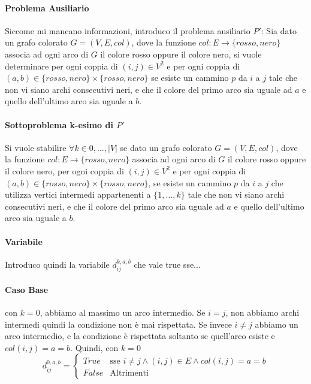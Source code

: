 \documentclass[12pt, a4paper, openany]{book}
\begin{document}
\paragraph*{Problema Ausiliario} 
Siccome mi mancano informazioni, introduco il problema ausiliario $P'$:
Sia dato un grafo colorato $G=(V,E,col)$, dove la funzione $col:E\to \{rosso,nero\}$ associa ad ogni arco di $G$ il colore rosso oppure il colore nero,
si vuole determinare per ogni coppia di $(i,j) \in V^2$ e per ogni coppia di $(a,b)\in \{rosso,nero\}\times \{rosso,nero\}$ se esiste un cammino $p$ da $i$ a $j$ tale che 
non vi siano archi consecutivi neri, e che il colore del primo arco sia uguale ad $a$ e quello dell'ultimo arco sia uguale a $b$.

\paragraph*{Sottoproblema k-esimo di $P'$}
Si vuole stabilire $\forall k \in {0,...,|V|}$ se dato un grafo colorato $G=(V,E,col)$, dove la funzione $col:E\to \{rosso,nero\}$ associa ad ogni arco di $G$ il colore rosso oppure il colore nero,
per ogni coppia di $(i,j) \in V^2$ e per ogni coppia di $(a,b)\in \{rosso,nero\}\times \{rosso,nero\}$,  se esiste un cammino $p$ da $i$ a $j$ che utilizza vertici intermedi appartenenti a $\{1,...,k\}$ tale che
non vi siano archi consecutivi neri, e che il colore del primo arco sia uguale ad $a$ e quello dell'ultimo arco sia uguale a $b$.

\paragraph*{Variabile}
Introduco quindi la variabile $d_{ij}^{k,a,b}$ che vale true sse...

\paragraph*{Caso Base} con $k=0$, abbiamo al massimo un arco intermedio.
Se $i=j$, non abbiamo archi intermedi quindi la condizione non è mai rispettata.
Se invece $i\neq j$ abbiamo un arco intermedio, e la condizione è rispettata soltanto se quell'arco esiste e $col(i,j)=a=b$.
Quindi, con $k=0$
$$
d_{ij}^{0,a,b}= \begin{cases}
	True & \text{sse } i\neq j \wedge (i,j) \in E \wedge col(i,j) = a = b\\
	False & \text{Altrimenti} 
\end{cases}
$$
\end{document}
